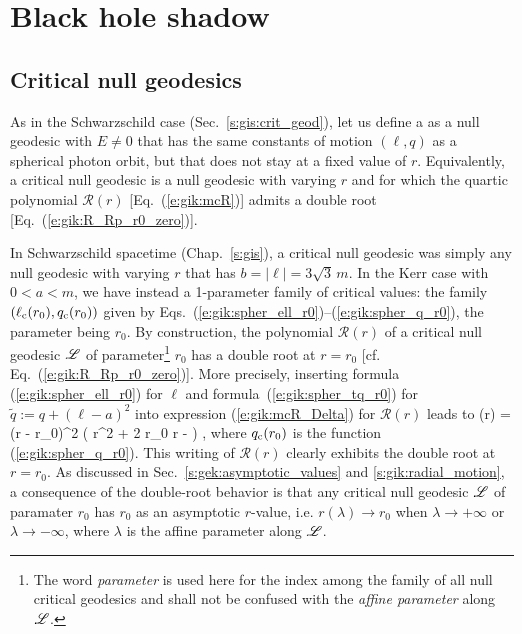 \section{Black hole shadow} \label{s:gik:shadow}

\subsection{Critical null geodesics} \label{s:gik:critical_geod}

As in the Schwarzschild case (Sec.~\ref{s:gis:crit_geod}), let us define
a 
as a null geodesic with $E\neq 0$ that has the same constants of motion
$(\ell,q)$ as a spherical photon orbit, but that does not stay at a fixed value
of $r$. Equivalently, a critical null geodesic
is a null geodesic with varying $r$ and for which the quartic polynomial $\mathcal{R}(r)$
[Eq.~(\ref{e:gik:mcR})] admits a double root [Eq.~(\ref{e:gik:R_Rp_r0_zero})].

In Schwarzschild spacetime (Chap.~\ref{s:gis}),
a critical null geodesic was simply any null geodesic with varying $r$
that has $b = |\ell| = 3\sqrt{3}\, m$.
In the Kerr case with $0 < a < m$, we have instead a 1-parameter family of critical values:
the family $(\ell_{\rm c}(r_0),q_{\rm c}(r_0))$ given by Eqs.~(\ref{e:gik:spher_ell_r0})--(\ref{e:gik:spher_q_r0}), the
parameter being $r_0$. By construction, the polynomial $\mathcal{R}(r)$
of a critical null geodesic $\mathscr{L}$ of parameter\footnote{The word \emph{parameter} is
used here for the index among the family of all null critical geodesics and shall
not be confused with the \emph{affine parameter} along $\mathscr{L}$.} $r_0$ has a double root at $r=r_0$
[cf. Eq.~(\ref{e:gik:R_Rp_r0_zero})]. More precisely, inserting formula
(\ref{e:gik:spher_ell_r0}) for $\ell$ and formula~(\ref{e:gik:spher_tq_r0})
for $\tilde{q} := q + (\ell - a)^2$
into expression (\ref{e:gik:mcR_Delta}) for $\mathcal{R}(r)$ leads to
\be \label{e:gik:mR_critical_null}
    (r) = (r - r_0)^2 \left( r^2 + 2 r_0 r -  \right) ,
\ee
where $q_{\rm c}(r_0)$ is the function (\ref{e:gik:spher_q_r0}).
This writing of $\mathcal{R}(r)$ clearly exhibits the double root at $r=r_0$.
As discussed in Sec.~\ref{s:gek:asymptotic_values} and \ref{s:gik:radial_motion},
a consequence of the double-root behavior is that
any critical null geodesic $\mathscr{L}$ of paramater $r_0$ has
$r_0$ as an asymptotic $r$-value, i.e. $r(\lambda)\to r_0$
when $\lambda\to+\infty$ or $\lambda\to-\infty$, where $\lambda$ is the affine
parameter along $\mathscr{L}$.

